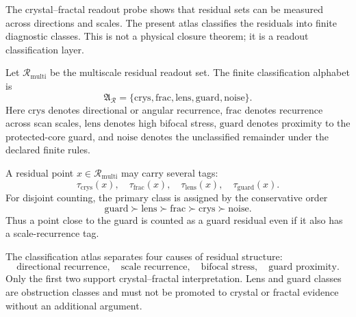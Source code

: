 The crystal--fractal readout probe shows that residual sets can be measured
across directions and scales.  The present atlas classifies the residuals into
finite diagnostic classes.  This is not a physical closure theorem; it is a
readout classification layer.

\begin{definition}
Let \(\mathcal R_{\mathrm{multi}}\) be the multiscale residual readout set.
The finite classification alphabet is
\[
    \mathfrak A_{\mathcal R}
    =
    \{\mathrm{crys},\mathrm{frac},\mathrm{lens},
      \mathrm{guard},\mathrm{noise}\}.
\]
Here \(\mathrm{crys}\) denotes directional or angular recurrence,
\(\mathrm{frac}\) denotes recurrence across scan scales,
\(\mathrm{lens}\) denotes high bifocal stress,
\(\mathrm{guard}\) denotes proximity to the protected-core guard, and
\(\mathrm{noise}\) denotes the unclassified remainder under the declared
finite rules.
\end{definition}

\begin{definition}
A residual point \(x\in\mathcal R_{\mathrm{multi}}\) may carry several tags:
\[
    \tau_{\mathrm{crys}}(x),\quad
    \tau_{\mathrm{frac}}(x),\quad
    \tau_{\mathrm{lens}}(x),\quad
    \tau_{\mathrm{guard}}(x).
\]
For disjoint counting, the primary class is assigned by the conservative order
\[
    \mathrm{guard}
    \succ
    \mathrm{lens}
    \succ
    \mathrm{frac}
    \succ
    \mathrm{crys}
    \succ
    \mathrm{noise}.
\]
Thus a point close to the guard is counted as a guard residual even if it also
has a scale-recurrence tag.
\end{definition}

\begin{proposition}
The classification atlas separates four causes of residual structure:
\[
\text{directional recurrence},\quad
\text{scale recurrence},\quad
\text{bifocal stress},\quad
\text{guard proximity}.
\]
Only the first two support crystal--fractal interpretation.  Lens and guard
classes are obstruction classes and must not be promoted to crystal or fractal
evidence without an additional argument.
\end{proposition}

